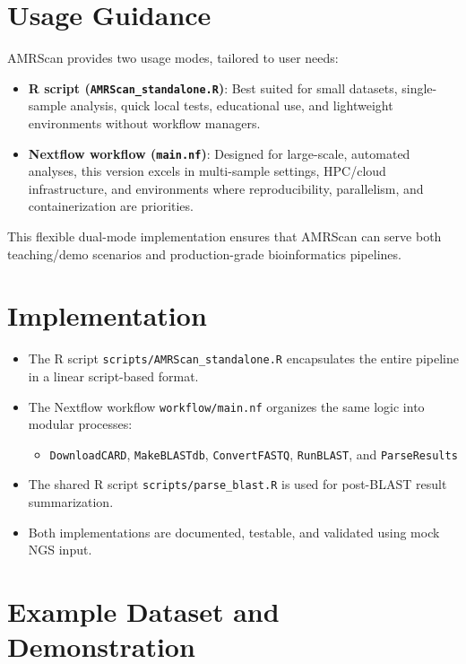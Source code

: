\documentclass[
]{article}
\providecommand{\tightlist}{%
  \setlength{\itemsep}{0pt}\setlength{\parskip}{0pt}}
\begin{document}
\section{Usage Guidance}\label{usage-guidance}

AMRScan provides two usage modes, tailored to user needs:

\begin{itemize}
\item
  \textbf{R script (\texttt{AMRScan\_standalone.R})}: Best suited for
  small datasets, single-sample analysis, quick local tests, educational
  use, and lightweight environments without workflow managers.
\item
  \textbf{Nextflow workflow (\texttt{main.nf})}: Designed for
  large-scale, automated analyses, this version excels in multi-sample
  settings, HPC/cloud infrastructure, and environments where
  reproducibility, parallelism, and containerization are priorities.
\end{itemize}

This flexible dual-mode implementation ensures that AMRScan can serve
both teaching/demo scenarios and production-grade bioinformatics
pipelines.

\section{Implementation}\label{implementation}

\begin{itemize}
\tightlist
\item
  The R script \texttt{scripts/AMRScan\_standalone.R} encapsulates the
  entire pipeline in a linear script-based format.
\item
  The Nextflow workflow \texttt{workflow/main.nf} organizes the same
  logic into modular processes:

  \begin{itemize}
  \tightlist
  \item
    \texttt{DownloadCARD}, \texttt{MakeBLASTdb}, \texttt{ConvertFASTQ},
    \texttt{RunBLAST}, and \texttt{ParseResults}
  \end{itemize}
\item
  The shared R script \texttt{scripts/parse\_blast.R} is used for
  post-BLAST result summarization.
\item
  Both implementations are documented, testable, and validated using
  mock NGS input.
\end{itemize}

\section{Example Dataset and
Demonstration}\label{example-dataset-and-demonstration}
\end{document}
